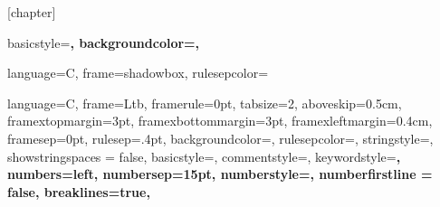 % 
% 
\usepackage{float}
[chapter]


{
  basicstyle=\scriptsize\bf\ttfamily,
  backgroundcolor=\color{gray75},
}

{
  language=C,
  frame=shadowbox, 
  rulesepcolor=\color{blue}
}

{
  language=C,
  frame=Ltb,
  framerule=0pt,
  tabsize=2,
  aboveskip=0.5cm,
  framextopmargin=3pt,
  framexbottommargin=3pt,
  framexleftmargin=0.4cm,
  framesep=0pt,
  rulesep=.4pt,
  backgroundcolor=\color{gray97},
  rulesepcolor=\color{black},
  stringstyle=\ttfamily,
  showstringspaces = false,
  basicstyle=\footnotesize\ttfamily,
  commentstyle=\color{gray45},
  keywordstyle=\bfseries,
  numbers=left,
  numbersep=15pt,
  numberstyle=\tiny,
  numberfirstline = false,
  breaklines=true,
}	

